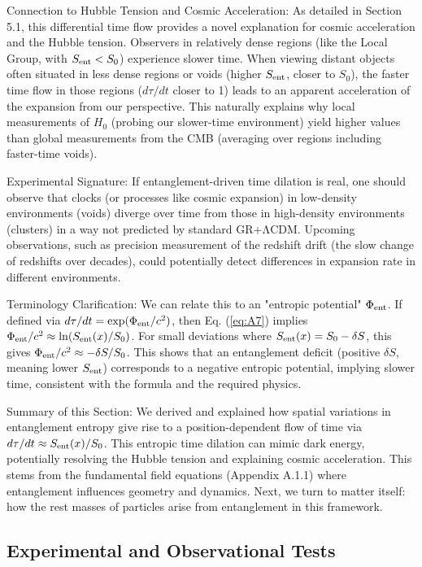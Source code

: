 \documentclass[11pt]{article}
\begin{document}
Connection to Hubble Tension and Cosmic Acceleration: As detailed in Section 5.1, this differential time flow provides a novel explanation for cosmic acceleration and the Hubble tension. Observers in relatively dense regions (like the Local Group, with $S_{\rm ent} < S_0$) experience slower time. When viewing distant objects often situated in less dense regions or voids (higher $S_{\rm ent}$, closer to $S_0$), the faster time flow in those regions ($d\tau/dt$ closer to 1) leads to an apparent acceleration of the expansion from our perspective. This naturally explains why local measurements of $H_0$ (probing our slower-time environment) yield higher values than global measurements from the CMB (averaging over regions including faster-time voids).  

Experimental Signature: If entanglement-driven time dilation is real, one should observe that clocks (or processes like cosmic expansion) in low-density environments (voids) diverge over time from those in high-density environments (clusters) in a way not predicted by standard GR+ΛCDM. Upcoming observations, such as precision measurement of the redshift drift (the slow change of redshifts over decades), could potentially detect differences in expansion rate in different environments.  

Terminology Clarification: We can relate this to an "entropic potential" $\Phi_{\rm ent}$. If defined via $d\tau/dt = \exp(\Phi_{\rm ent} / c^2)$, then Eq. (\ref{eq:A7}) implies $\Phi_{\rm ent} / c^2 \approx \ln(S_{\rm ent}(x) / S_0)$. For small deviations where $S_{\rm ent}(x) = S_0 - \delta S$, this gives $\Phi_{\rm ent} / c^2 \approx -\delta S / S_0$. This shows that an entanglement deficit (positive $\delta S$, meaning lower $S_{\rm ent}$) corresponds to a negative entropic potential, implying slower time, consistent with the formula and the required physics.

Summary of this Section: We derived and explained how spatial variations in entanglement entropy give rise to a position-dependent flow of time via $d\tau/dt \approx S_{\rm ent}(x) / S_0$. This entropic time dilation can mimic dark energy, potentially resolving the Hubble tension and explaining cosmic acceleration. This stems from the fundamental field equations (Appendix A.1.1) where entanglement influences geometry and dynamics. Next, we turn to matter itself: how the rest masses of particles arise from entanglement in this framework.

\subsection{Experimental and Observational Tests} %
\end{document}
